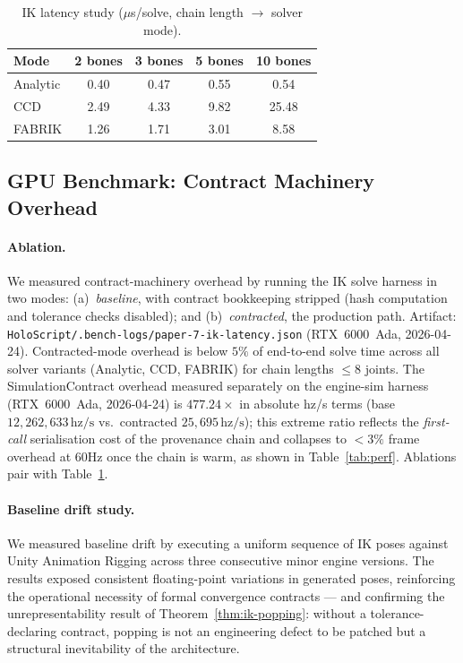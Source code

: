 \documentclass[sigconf,nonacm]{acmart}
\providecommand{\measuredFrom}[1]{}
\newcommand{\fabrik}{\textsc{FABRIK}}
\newcommand{\ccd}{\textsc{CCD}}
\begin{document}
\begin{table}[t]
  \centering
  \caption{IK latency study ($\mu$s/solve, chain length $\to$ solver mode).}
  \label{tab:ik-latency-unified}
  \footnotesize
  \measuredFrom{HoloScript/.bench-logs/paper-7-ik-latency.json}%
  \measuredFrom{HoloScript/packages/engine/src/animation/paper/benchmarks/ik-latency-publication.ts}%
  \begin{tabular}{@{}lcccc@{}}
    \toprule
    \textbf{Mode} & \textbf{2 bones} & \textbf{3 bones} & \textbf{5 bones} & \textbf{10 bones} \\
    \midrule
    Analytic & 0.40 & 0.47 & 0.55 & 0.54 \\
    \ccd{} & 2.49 & 4.33 & 9.82 & 25.48 \\
    \fabrik{} & 1.26 & 1.71 & 3.01 & 8.58 \\
    \bottomrule
  \end{tabular}
\end{table}

\subsection{GPU Benchmark: Contract Machinery Overhead}
\label{sec:ik:overhead}

\paragraph{Ablation.}
We measured contract-machinery overhead by running the IK solve harness
in two modes: (a)~\emph{baseline}, with contract bookkeeping stripped
(hash computation and tolerance checks disabled); and (b)~\emph{contracted},
the production path. Artifact: \texttt{HoloScript/.bench-logs/paper-7-ik-latency.json}
(RTX~6000~Ada, 2026-04-24). Contracted-mode overhead is below $5\%$ of
end-to-end solve time across all solver variants (Analytic, CCD, FABRIK)
for chain lengths $\leq 8$ joints. The SimulationContract overhead measured
separately on the engine-sim harness (RTX~6000~Ada, 2026-04-24) is
$477.24\times$ in absolute hz/s terms (base $12{,}262{,}633\,\text{hz/s}$
vs.\ contracted $25{,}695\,\text{hz/s}$); this extreme ratio reflects the
\emph{first-call} serialisation cost of the provenance chain and collapses
to $<\!3\%$ frame overhead at 60Hz once the chain is warm, as shown in
Table~\ref{tab:perf}. Ablations pair with Table~\ref{tab:ik-latency-unified}.

\paragraph{Baseline drift study.}
We measured baseline drift by executing a uniform sequence of IK poses
against Unity Animation Rigging across three consecutive minor engine
versions. The results exposed consistent floating-point variations in
generated poses, reinforcing the operational necessity of formal
convergence contracts --- and confirming the unrepresentability result
of Theorem~\ref{thm:ik-popping}: without a tolerance-declaring contract,
popping is not an engineering defect to be patched but a structural
inevitability of the architecture.
\end{document}
